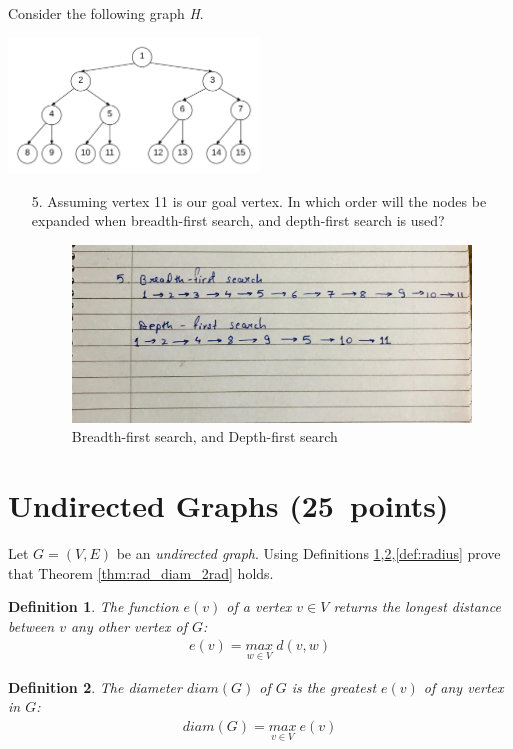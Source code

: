 \documentclass{resources/WeSTassignment}
\newtheorem{definition}{Definition}
\begin{document}
Consider the following graph \emph{H}.
\begin{center}
			\includegraphics[width=0.5\textwidth]{uninformed_graph}
		\end{center}
\begin{enumerate}
    \item[5.] Assuming vertex 11 is our goal vertex. In which order will the nodes be expanded when breadth-first search, and depth-first search is used?
    \begin{figure}[ht]
    \centering
    \includegraphics[scale=0.4]{./resources/2.5.jpeg}
    \caption{Breadth-first search, and Depth-first search}
    \label{fig:Breadth-first search, and Depth-first search}
\end{figure}
\end{enumerate}

\section{Undirected Graphs \hfill (25~points)}
Let $G= (V,E)$ be an \emph{undirected graph}. Using Definitions \ref{def:eccentricity},\ref{def:diameter},\ref{def:radius} prove that Theorem \ref{thm:rad_diam_2rad} holds.
\begin{definition} \label{def:eccentricity}
The function $e(v)$ of a vertex $v \in V$ returns the longest distance between $v$ any other vertex of $G$: 
\begin{align*}
e(v) = \underset{w \in V}{max}~ d(v,w)   
\end{align*}
\end{definition}
\begin{definition} \label{def:diameter}
The \emph{diameter} $diam(G)$ of $G$ is the greatest $e(v)$ of any vertex in $G$:
\begin{align*}
    diam(G) = \underset{v \in V}{max}~ e(v)
\end{align*}
\end{definition}
\end{document}
